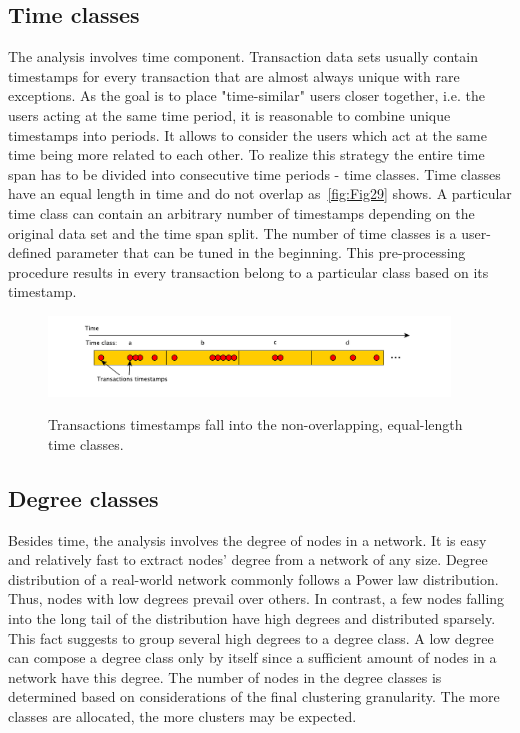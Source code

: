\subsection{Time classes}
The analysis involves time component. Transaction data sets usually contain timestamps for every transaction that are almost always unique with rare exceptions. As the goal is to place "time-similar" users closer together, i.e. the users acting at the same time period, it is reasonable to combine unique timestamps into periods. It allows to consider the users which act at the same time being more related to each other. To realize this strategy the entire time span has to be divided into consecutive time periods - time classes. Time classes have an equal length in time and do not overlap as~\autoref{fig:Fig29} shows. A particular time class can contain an arbitrary number of timestamps depending on the original data set and the time span split. The number of time classes is a user-defined parameter that can be tuned in the beginning. This pre-processing procedure results in every transaction belong to a particular class based on its timestamp.

\begin{figure}[!ht]
	\centering
	\includegraphics[width=0.95\textwidth]{images/Fig29.pdf}\\
	\caption{Transactions timestamps fall into the non-overlapping, equal-length time classes.}
	\label{fig:Fig29}
\end{figure}

\subsection{Degree classes}
Besides time, the analysis involves the degree of nodes in a network. 
It is easy and relatively fast to extract nodes' degree from a network of any size. Degree distribution of a real-world network commonly follows a Power law distribution. Thus, nodes with low degrees prevail over others. In contrast, a few nodes falling into the long tail of the distribution have high degrees and distributed sparsely. This fact suggests to group several high degrees to a degree class. A low degree can compose a degree class only by itself since a sufficient amount of nodes in a network have this degree. The number of nodes in the degree classes is determined based on considerations of the final clustering granularity. The more classes are allocated, the more clusters may be expected. 

